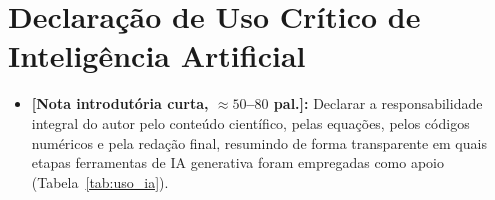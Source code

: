 \documentclass[aps,pre,twocolumn,10pt,superscriptaddress,nofootinbib]{revtex4-2}
\begin{document}
\section*{Declaração de Uso Crítico de Inteligência Artificial}
\label{sec:declaracao_ia}

\begin{itemize}
  \item \textbf{[Nota introdutória curta, $\approx 50$--$80$ pal.]:}
        Declarar a responsabilidade integral do autor pelo conteúdo científico, pelas equações, pelos códigos numéricos e pela redação final, resumindo de forma transparente em quais etapas ferramentas de IA generativa foram empregadas como apoio (Tabela~\ref{tab:uso_ia}).
\end{itemize}
\end{document}
